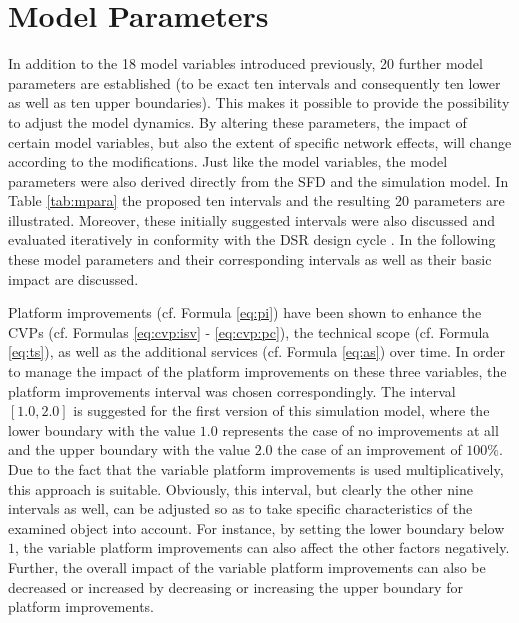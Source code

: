 \section{Model Parameters}\label{ch:sfd:mp}

In addition to the 18 model variables introduced previously, 20 further model parameters are established (to be exact ten intervals and consequently ten lower as well as ten upper boundaries). This makes it possible to provide the possibility to adjust the model dynamics. By altering these parameters, the impact of certain model variables, but also the extent of specific network effects, will change according to the modifications. Just like the model variables, the model parameters were also derived directly from the \ac{SFD} and the simulation model. In Table \ref{tab:mpara} the proposed ten intervals and the resulting 20 parameters are illustrated. Moreover, these initially suggested intervals were also discussed and evaluated iteratively in conformity with the \ac{DSR} design cycle \citep{Hevner2007}. In the following these model parameters and their corresponding intervals as well as their basic impact are discussed.

Platform improvements (cf. Formula \ref{eq:pi}) have been shown to enhance the \acp{CVP} (cf. Formulas \ref{eq:cvp:isv} - \ref{eq:cvp:pc}), the technical scope (cf. Formula \ref{eq:ts}), as well as the additional services (cf. Formula \ref{eq:as}) over time. In order to manage the impact of the platform improvements on these three variables, the platform improvements interval was chosen correspondingly. The interval $[1.0,2.0]$ is suggested for the first version of this simulation model, where the lower boundary with the value $1.0$ represents the case of no improvements at all and the upper boundary with the value $2.0$ the case of an improvement of $100\%$. Due to the fact that the variable platform improvements is used multiplicatively, this approach is suitable. Obviously, this interval, but clearly the other nine intervals as well, can be adjusted so as to take specific characteristics of the examined object into account. For instance, by setting the lower boundary below $1$, the variable platform improvements can also affect the other factors negatively. Further, the overall impact of the variable platform improvements can also be decreased or increased by decreasing or increasing the upper boundary for platform improvements.

